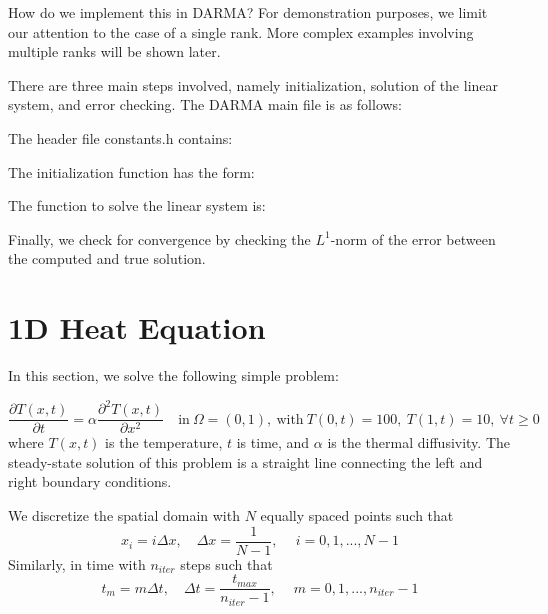 How do we implement this in DARMA? 
For demonstration purposes, we limit our attention to the case 
of a single rank. More complex examples involving multiple ranks will be shown later. 

There are three main steps involved, namely initialization, 
solution of the linear system, and error checking. 
The DARMA main file is as follows:


The header file constants.h contains:


The initialization function has the form:


The function to solve the linear system is:


Finally, we check for convergence by checking the $L^1$-norm of the 
error between the computed and true solution.






\section{1D Heat Equation}

In this section, we solve the following simple problem:

\begin{equation} 
	\frac{\partial T(x,t)}{\partial t} = 
  \alpha \frac{\partial^2 T(x,t)}{\partial x^2} \quad 
  \text{in} \ \Omega=(0,1), \ \text{with} 
  \ T(0,t)=100, \ T(1,t)=10, \ \forall t \geq 0
\end{equation} 
where $T(x,t)$ is the temperature, $t$ is time, and $\alpha$ is the 
thermal diffusivity. The steady-state solution of this problem is 
a straight line connecting the left and right boundary conditions. 

We discretize the spatial domain with $N$ equally spaced points such that 
\begin{equation}
x_i = i \Delta x, \quad \Delta x=\frac{1}{N-1}, \quad \ i=0,1,...,N-1
\end{equation}
Similarly, in time with $n_{iter}$ steps such that 
\begin{equation}
t_m = m \Delta t, \quad \Delta t=\frac{t_{max}}{n_{iter}-1}, \quad \ m=0,1,...,n_{iter}-1
\end{equation}


